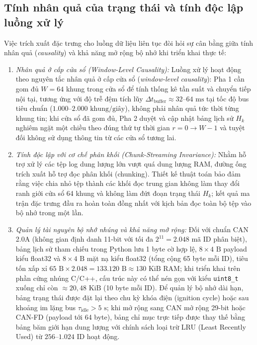 \documentclass[12pt, a4paper, reqno, oneside]{book}
\DeclareRobustCommand{\code}[1]{\nolinkurl{#1}}
\begin{document}
\subsection{Tính nhân quả của trạng thái và tính độc lập luồng xử lý}
Việc trích xuất đặc trưng cho luồng dữ liệu liên tục đòi hỏi sự cân bằng giữa tính nhân quả (\textit{causality}) và khả năng mở rộng bộ nhớ khi triển khai thực tế:
\begin{enumerate}
    \item \textit{Nhân quả ở cấp cửa sổ (Window-Level Causality):} Luồng xử lý hoạt động theo nguyên tắc nhân quả ở cấp cửa sổ (\textit{window-level causality}): Pha 1 cần gom đủ $W=64$ khung trong cửa sổ để tính thống kê tần suất và chuyển tiếp nội tại, tương ứng với độ trễ đệm tích lũy $\Delta t_{\text{buffer}} \approx 32\text{--}64\text{ ms}$ tại tốc độ bus tiêu chuẩn ($1.000\text{--}2.000\text{ khung/giây}$), không phải nhân quả tức thời từng khung tin; khi cửa sổ đã gom đủ, Pha 2 duyệt và cập nhật bảng lịch sử $H_k$ nghiêm ngặt một chiều theo đúng thứ tự thời gian $r=0 \to W-1$ và tuyệt đối không sử dụng thông tin từ các cửa sổ tương lai.
    \item \textit{Tính độc lập với cơ chế phân khối (Chunk-Streaming Invariance):} Nhằm hỗ trợ xử lý các tệp log dung lượng lớn vượt quá dung lượng RAM, đường ống trích xuất hỗ trợ đọc phân khối (chunking). Thiết kế thuật toán bảo đảm rằng việc chia nhỏ tệp thành các khối đọc trung gian không làm thay đổi ranh giới cửa sổ 64 khung và không làm đứt đoạn trạng thái $H_k$; kết quả ma trận đặc trưng đầu ra hoàn toàn đồng nhất với kịch bản đọc toàn bộ tệp vào bộ nhớ trong một lần.
    \item \textit{Quản lý tài nguyên bộ nhớ nhúng và khả năng mở rộng:} Đối với chuẩn CAN 2.0A (không gian định danh 11-bit với tối đa $2^{11} = 2.048$ mã ID phân biệt), bảng lịch sử tham chiếu trong Python lưu 1 byte cờ hợp lệ, $8 \times 4\text{ B}$ payload kiểu float32 và $8 \times 4\text{ B}$ mặt nạ kiểu float32 (tổng cộng 65 byte mỗi ID), tiêu tốn xấp xỉ $65\text{ B} \times 2.048 = 133.120\text{ B} \approx 130\text{ KiB}$ RAM; khi triển khai trên phần cứng nhúng C/C++, cấu trúc này có thể nén gọn với kiểu \code{uint8_t} xuống chỉ còn $\approx 20{,}48\text{ KiB}$ (10 byte mỗi ID). Để quản lý bộ nhớ dài hạn, bảng trạng thái được đặt lại theo chu kỳ khóa điện (ignition cycle) hoặc sau khoảng im lặng bus $\tau_{\text{idle}} > 5\text{ s}$; khi mở rộng sang CAN mở rộng 29-bit hoặc CAN-FD (payload tới 64 byte), bảng chỉ mục trực tiếp được thay thế bằng bảng băm giới hạn dung lượng với chính sách loại trừ LRU (Least Recently Used) từ $256\text{--}1.024$ ID hoạt động.
\end{enumerate}
\end{document}
